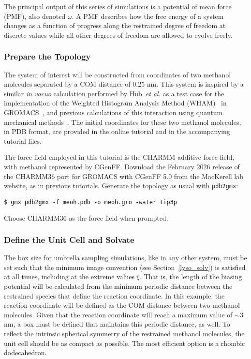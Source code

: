 \documentclass[9pt,tutorial,pubversion]{livecoms}
\begin{document}
The principal output of this series of simulations is a potential of mean force (PMF), also denoted $\omega$. A PMF describes how the free energy of a system changes as a function of progress along the restrained degree of freedom at discrete values while all other degrees of freedom are allowed to evolve freely.

\subsubsection{Prepare the Topology} \label{umbrella_topology}

The system of interest will be constructed from coordinates of two methanol molecules separated by a COM distance of 0.25 nm. This system is inspired by a similar \textit{in vacuo} calculation performed by Hub~\textit{et al.} as a test case for the implementation of the Weighted Histogram Analysis Method (WHAM)~\cite{Kumar1992} in GROMACS~\cite{Hub2010}, and previous calculations of this interaction using quantum mechanical methods~\cite{Ghosh2012}. The initial coordinates for these two methanol molecules, in PDB format, are provided in the online tutorial and in the accompanying tutorial files. 

The force field employed in this tutorial is the CHARMM additive force field, with methanol represented by CGenFF. Download the February 2026 release of the CHARMM36 port for GROMACS with CGenFF 5.0 from the MacKerell lab website, as in previous tutorials. Generate the topology as usual with \texttt{pdb2gmx}:

\begin{lstlisting}
$ gmx pdb2gmx -f meoh.pdb -o meoh.gro -water tip3p
\end{lstlisting}
%
Choose CHARMM36 as the force field when prompted.

\subsubsection{Define the Unit Cell and Solvate} \label{umbrella_box}

The box size for umbrella sampling simulations, like in any other system, must be set such that the minimum image convention (see Section~\ref{lyso_solv}) is satisfied at all times, including at the extreme values $\xi$. That is, the length of the biasing potential will be calculated from the minimum periodic distance between the restrained species that define the reaction coordinate. In this example, the reaction coordinate will be defined as the COM distance between two methanol molecules. Given that the reaction coordinate will reach a maximum value of $\sim$3 nm, a box must be defined that maintains this periodic distance, as well. To reflect the intrinsic spherical symmetry of the restrained methanol molecules, the unit cell should be as compact as possible. The most efficient option is a rhombic dodecahedron.
\end{document}
